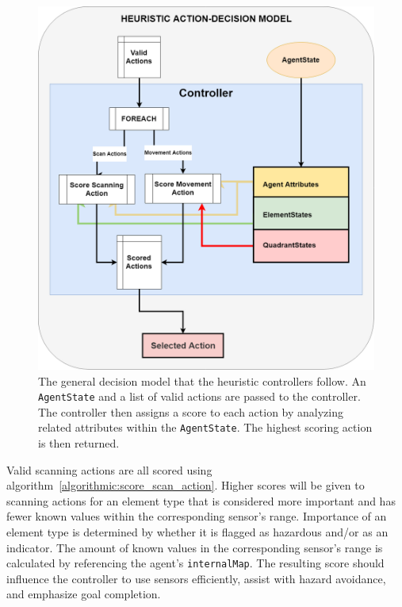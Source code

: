 \begin{figure}[H]
  \centering
  \includegraphics[width=0.85\columnwidth]{Figures/heuristic_decision_model.png}
  \caption[Heuristic Control Model]{The general decision model that the heuristic controllers follow. An \texttt{AgentState} and a list of valid actions are passed to the controller. The controller then assigns a score to each action by analyzing related attributes within the \texttt{AgentState}. The highest scoring action is then returned.}
  \label{fig:heuristic_decision_model}
\end{figure}

Valid scanning actions are all scored using algorithm~\ref{algorithmic:score_scan_action}.
Higher scores will be given to scanning actions for an element type that is considered more important and has fewer known values within the corresponding sensor's range.
Importance of an element type is determined by whether it is flagged as hazardous and/or as an indicator.
The amount of known values in the corresponding sensor's range is calculated by referencing the agent's \texttt{internalMap}.
The resulting score should influence the controller to use sensors efficiently, assist with hazard avoidance, and emphasize goal completion.

